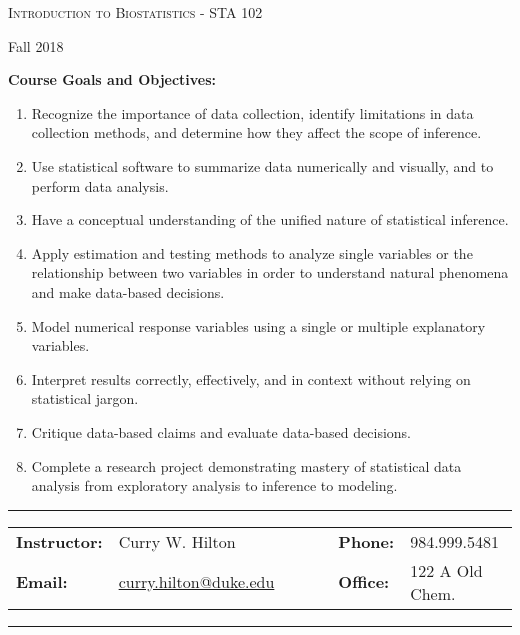 \documentclass[11pt, a4paper]{article}
\begin{document}
\begin{center}
{\Large \textsc{Introduction to Biostatistics - STA 102}}
\end{center}
\begin{center}
Fall 2018
\end{center}

\noindent\textbf{Course Goals and Objectives:}  

\vspace{5mm}


\begin{enumerate}
\item Recognize the importance of data collection, identify limitations in data collection
methods, and determine how they affect the scope of inference.
\item Use statistical software to summarize data numerically and visually, and to perform data
analysis.
\item Have a conceptual understanding of the unified nature of statistical inference.
\item Apply estimation and testing methods to analyze single variables or the relationship
between two variables in order to understand natural phenomena and make data-based
decisions.
\item Model numerical response variables using a single or multiple explanatory variables.
\item Interpret results correctly, effectively, and in context without relying on statistical jargon.
\item Critique data-based claims and evaluate data-based decisions.
\item Complete a research project demonstrating mastery of statistical data analysis from
exploratory analysis to inference to modeling. 

\end{enumerate}



\begin{center}
\rule{6in}{0.4pt}
\begin{minipage}[t]{.75\textwidth}
\begin{tabular}{llcccll}
\textbf{Instructor:} & Curry W. Hilton & & &  & \textbf{Phone:} & 984.999.5481 \\
\textbf{Email:} &  \href{mailto:curry.hilton@duke.edu}{curry.hilton@duke.edu} & & & & \textbf{Office:} & 122 A Old Chem.
\end{tabular}
\end{minipage}
\rule{6in}{0.4pt}
\end{center}
\vspace{.5cm}
\setlength{\unitlength}{1in}
\renewcommand{\arraystretch}{2}
\end{document}
